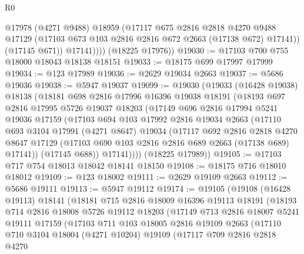 \begin{lexlean}{R0}
\begin{coremodule}
                @17978
                (@4271 @9488)
                @18959
                (@17117
                  @675
                  @2816
                  @2818
                  @4270
                  @9488
                  @17129
                  (@17103 @673 @103 @2816 @2816 @672 @2663 (@17138 @672) @17141))
                (@17145 @671))
              @17141))))
      (@18225 @17976))
@19030 := @17103 @700 @755 @18000 @18043 @18138 @18151
@19033 := @18175 @699 @17997 @17999
@19034 := @123 @17989
@19036 := @2629 @19034 @2663
@19037 := @5686 @19036
@19038 := @5947 @19037
@19099 := @19030
    (@19033
      (@16428 @19038)
      @18138
      (@18181
        @698
        @2816
        @17996
        @16396
        @19038
        @18191
        (@18193
          @697
          @2816
          @17995
          @5726
          @19037
          @18203
          (@17149
            @696
            @2816
            @17994
            @5241
            @19036
            @17159
            (@17103
              @694
              @103
              @17992
              @2816
              @19034
              @2663
              (@17110
                @693
                @3104
                @17991
                (@4271 @8647)
                @19034
                (@17117
                  @692
                  @2816
                  @2818
                  @4270
                  @8647
                  @17129
                  (@17103 @690 @103 @2816 @2816 @689 @2663 (@17138 @689) @17141))
                (@17145 @688))
              @17141))))
      (@18225 @17989))
@19105 := @17103 @717 @754 @18013 @18042 @18141 @18150
@19108 := @18175 @716 @18010 @18012
@19109 := @123 @18002
@19111 := @2629 @19109 @2663
@19112 := @5686 @19111
@19113 := @5947 @19112
@19174 := @19105
    (@19108
      (@16428 @19113)
      @18141
      (@18181
        @715
        @2816
        @18009
        @16396
        @19113
        @18191
        (@18193
          @714
          @2816
          @18008
          @5726
          @19112
          @18203
          (@17149
            @713
            @2816
            @18007
            @5241
            @19111
            @17159
            (@17103
              @711
              @103
              @18005
              @2816
              @19109
              @2663
              (@17110
                @710
                @3104
                @18004
                (@4271 @10204)
                @19109
                (@17117
                  @709
                  @2816
                  @2818
                  @4270

\end{coremodule}
\end{lexlean}
